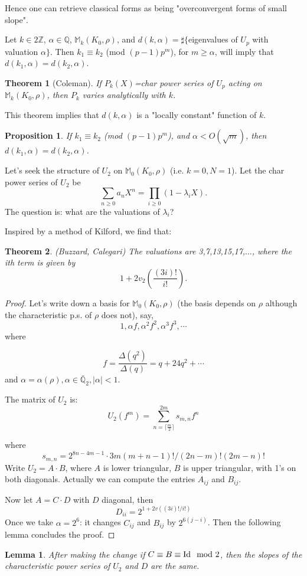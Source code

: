 \documentclass{article}%
\newtheorem{prop}[theorem]{Proposition}
\newtheorem{lem}[theorem]{Lemma}
\newtheorem{thm}{Theorem}
\newcommand{\BZ}{{\mathbb{Z}}}
\newcommand{\BQ}{{\mathbb{Q}}}
\begin{document}
Hence one can retrieve classical forms as being "overconvergent forms of
small slope".

 Let $k\in 2\BZ$, $\alpha\in\BQ$, 
$\mathbb{M}_k(K_0,\rho)$, and $d(k,\alpha)=\sharp\{$eigenvalues of $U_p$
with valuation
$\alpha\}$. Then $k_1\equiv k_2$ (mod $(p-1)p^m$), for $m\geq\alpha$, will
imply that
$d(k_1,\alpha)=d(k_2,\alpha)$.

\vspace{.2in}
\begin{thm}[Coleman]
If $P_k(X)$=char power series of $U_p$ acting on $\mathbb{M}_k(K_0,\rho)$,
then
$P_k$ varies analytically with $k$.
\end{thm}

This theorem implies that $d(k,\alpha)$ is a "locally constant" function of
$k$.

\begin{prop}
If $k_1\equiv k_2$ (mod $(p-1)p^m$), and $\alpha<O(\sqrt{m})$, then
$d(k_1,\alpha)=d(k_2,\alpha)$.
\end{prop}
 
\vspace{.2in}

Let's seek the structure of $U_2$ on $\mathbb{M}_0(K_0,\rho)$ (i.e. $k=0,
N=1$). Let
the char power series of $U_2$ be 
$$\sum_{n\geq0}a_nX^n=\prod_{i\geq0}(1-\lambda_iX).$$
The question is: what are the valuations of $\lambda_i$?

Inspired by a method of Kilford, we find that:

\begin{thm}(Buzzard, Calegari)
The valuations are 3,7,13,15,17,$\ldots$, where the ith term is given by
$$1+2v_2\left(\frac{(3i)!}{i!}\right).$$
\end{thm}
\begin{proof}
Let's write down a basis for $\mathbb{M}_0(K_0,\rho)$ (the basis depends on
$\rho$ although the characteristic p.s. of $\rho$ does not), say,
$$1,\alpha f,\alpha^2 f^2,\alpha^3 f^3,\cdots$$
where 

$$f=\frac{\Delta(q^2)}{\Delta(q)}=q+24q^2+\cdots$$
and $\alpha=\alpha(\rho), \alpha\in\bar{\mathbb{Q}}_2,|\alpha|<1$.



The matrix of $U_2$ is: 
$$U_2(f^m)=\sum_{n=\lceil\frac{m}2\rceil}^{2m}s_{m,n}f^n$$

where
$$s_{m,n}=2^{8n-4m-1}\cdot3m(m+n-1)!/(2n-m)!(2m-n)!$$
Write $U_2=A\cdot B$, where $A$ is lower triangular, $B$ is upper
triangular, with 1's on both diagonals. Actually we can compute the entries
$A_{ij}$ and $B_{ij}$. 

Now let $A=C\cdot D$ with $D$ diagonal, then 
$$D_{ii}=2^{1+2v((3i)!/i!)}$$
Once we  take $\alpha=2^6$: it changes $C_{ij}$ and $B_{ij}$ by
$2^{6(j-i)}$. Then the following lemma  concludes the proof. \end{proof} 

\begin{lem}
After  making the change if $C\equiv B\equiv\text{Id}\hspace{.1in}\text{mod
2}$, then the slopes of the characteristic power series of $U_2$ and $D$ are
the same.
\end{lem}
\end{document}
